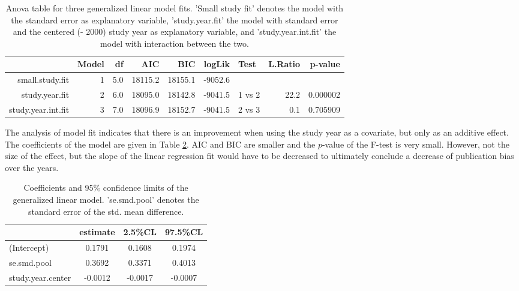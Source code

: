 \documentclass[11pt,a4paper,twoside]{book}\usepackage[]{graphicx}\usepackage[]{color}
\begin{document}
\begin{table}[ht]
\centering
\begingroup\scriptsize
\begin{tabular}{rrrrrrlrr}
  \hline
 & Model & df & AIC & BIC & logLik & Test & L.Ratio & p-value \\ 
  \hline
small.study.fit &  1 & 5.0 & 18115.2 & 18155.1 & -9052.6 &  &  &  \\ 
  study.year.fit &  2 & 6.0 & 18095.0 & 18142.8 & -9041.5 & 1 vs 2 & 22.2 & 0.000002 \\ 
  study.year.int.fit &  3 & 7.0 & 18096.9 & 18152.7 & -9041.5 & 2 vs 3 & 0.1 & 0.705909 \\ 
   \hline
\end{tabular}
\endgroup
\caption{Anova table for three generalized linear model fits. 'Small study fit' denotes the model with the standard error as explanatory variable, 'study.year.fit' the model with standard error and the centered (- 2000) study year as explanatory variable, and 'study.year.int.fit' the model with interaction between the two.} 
\label{anova.lme}
\end{table}


The analysis of model fit indicates that there is an improvement when using the study year as a covariate, but only as an additive effect. The coefficients of the model are given in Table \ref{coefficients.study.year.fit}. AIC and BIC are smaller and the $p$-value of the F-test is very small. However, not the size of the effect, but the slope of the linear regression fit would have to be decreased to ultimately conclude a decrease of publication bias over the years. 


\begin{table}[ht]
\centering
\begingroup\scriptsize
\begin{tabular}{lccc}
  \hline
 & estimate & 2.5\%CL & 97.5\%CL \\ 
  \hline
(Intercept) & 0.1791 & 0.1608 & 0.1974 \\ 
  se.smd.pool & 0.3692 & 0.3371 & 0.4013 \\ 
  study.year.center & -0.0012 & -0.0017 & -0.0007 \\ 
   \hline
\end{tabular}
\endgroup
\caption{Coefficients and 95\% confidence limits of the generalized linear model. 'se.smd.pool' denotes the standard error of the std. mean difference.} 
\label{coefficients.study.year.fit}
\end{table}
\end{document}
